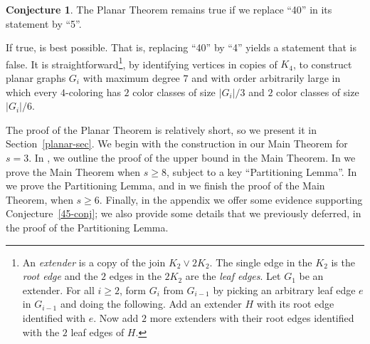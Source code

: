 \documentclass[11pt]{article}
\theoremstyle{definition}
\newtheorem{conj}[lem]{Conjecture}
\renewcommand\ge\geqslant
\begin{document}
\begin{conj}
	The Planar Theorem remains true if we replace ``40'' in its statement by ``5''.
	\label{planar-conj}
\end{conj}

If true,  is best possible.  That is, replacing ``40'' by ``4'' yields a statement that is false.  
It is straightforward\footnote{An \emph{extender} is a copy of the join $K_2\vee 2K_2$.  The single edge in the $K_2$ is the \emph{root edge} and the 
$2$ edges in the $2K_2$ are the \emph{leaf edges}.  Let $G_1$ be an extender.  For all $i\ge 2$, form $G_i$ from $G_{i-1}$ by picking an arbitrary
leaf edge $e$ in $G_{i-1}$ and doing the following.  Add an extender $H$ with its root edge identified with $e$.  Now add $2$ more extenders
with their root edges identified with the $2$ leaf edges of $H$.}, by identifying vertices in copies of $K_4$, to construct planar graphs $G_i$ 
with maximum degree $7$ and with order arbitrarily large in which every $4$-coloring has $2$ color classes of size $|G_i|/3$ and $2$ color classes 
of size $|G_i|/6$.

The proof of the Planar Theorem is relatively short, so we present it in Section~\ref{planar-sec}.
	We begin  with the construction in our Main Theorem for $s=3$.  In , we outline the proof of the 
	upper bound in the Main Theorem.  In  we prove the Main Theorem when $s\ge 8$, subject to a key ``Partitioning Lemma''.
	In  we prove the Partitioning Lemma, and in  we finish the proof of the Main Theorem, when $s\ge 6$.
	Finally, in the appendix we offer some evidence supporting Conjecture~\ref{45-conj}; we also provide some details that we previously deferred,
	in the proof of the Partitioning Lemma.
\end{document}
